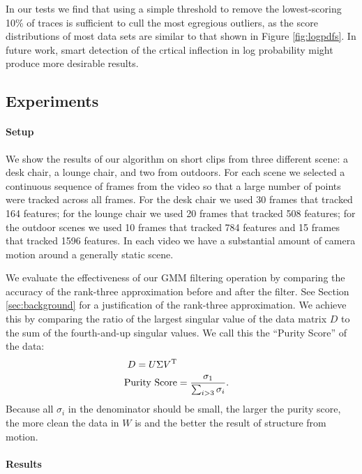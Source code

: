 In our tests we find that using a simple threshold to remove the lowest-scoring 10\% of traces 
is sufficient to cull the most egregious outliers, as the score distributions of most data sets are
similar to that shown in Figure \ref{fig:logpdfs}.  In future work, smart detection of the crtical 
inflection in log probability might produce more desirable results.


\subsection{Experiments} %
\label{sub:Experiments}

\paragraph{Setup} 
We show the results of our algorithm on short clips from three different scene: 
a desk chair, a lounge chair, and two from outdoors.  For each scene we selected a
continuous sequence of frames from the video so that a large number of points were tracked
across all frames.  For the desk chair we used 30
frames that tracked 164 features; for the lounge chair we used 20 frames that
tracked 508 features; for the outdoor scenes we used 10 frames that tracked
784 features and 15 frames that tracked 1596 features.  In each video we have a substantial
amount of camera motion around a generally static scene.

We evaluate the effectiveness of our GMM filtering operation by comparing the accuracy of the
rank-three approximation before and after the filter.  See Section \ref{sec:background} for
a justification of the rank-three approximation.  We achieve this by comparing the ratio of the largest singular value
of the data matrix $D$ to the sum of the fourth-and-up singular values.  We call this the ``Purity Score'' of the data: 
\begin{align}
	D = U\Sigma V^{\rm T} \\
	{\rm Purity\ Score} &= \frac{\sigma_1}{\sum_{i > 3} \sigma_i}.
\end{align}
Because all $\sigma_i$ in the denominator should be small, the larger the
purity score, the more clean the data in $W$ is and the better the result of
structure from motion.

\paragraph{Results} 

